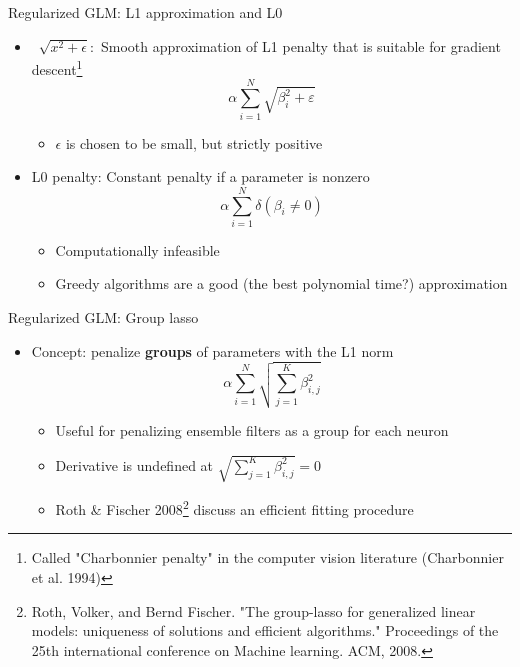 \documentclass[svgnames,13pt]{beamer}
\DeclareRobustCommand{\emph}[1]{\textbf{{\color{emphasizecolor} #1}}}
\begin{document}
\begin{frame}{Regularized GLM: L1 approximation and L0}
\begin{itemize}
	\item <1->~$\sqrt{x^2+\epsilon}:$ Smooth approximation of L1 penalty that is suitable for gradient descent\footnote{Called "Charbonnier penalty" in the computer vision literature (Charbonnier et al. 1994)}\[ \alpha \sum_{i=1}^N \sqrt{\beta_i^2+\varepsilon} \]
	\begin{itemize}
		\item <2->$\epsilon$ is chosen to be small, but strictly positive
		\end{itemize}
	\item <3->L0 penalty: Constant penalty if a parameter is nonzero\[ \alpha \sum_{i=1}^N \delta(\beta_i\ne 0) \]
	\begin{itemize}
		\item <4->Computationally infeasible
		\item <5->Greedy algorithms are a good (the best polynomial time?) approximation
	\end{itemize}
\end{itemize}
\end{frame} 

\begin{frame}{Regularized GLM: Group lasso}
\begin{itemize}
	\item <1->Concept: penalize \emph{groups} of parameters with the L1 norm\[ \alpha \sum_{i=1}^N \sqrt{ \sum_{j=1}^K \beta_{i,j}^2 } \]
	\begin{itemize}
		\item <2->Useful for penalizing ensemble filters as a group for each neuron
		\item <3->Derivative is undefined at $\sqrt{ \sum_{j=1}^K \beta_{i,j}^2 }=0$
		\item <4->Roth \& Fischer 2008\footnote{Roth, Volker, and Bernd Fischer. "The group-lasso for generalized linear models: uniqueness of solutions and efficient algorithms." Proceedings of the 25th international conference on Machine learning. ACM, 2008.} discuss an efficient fitting procedure
	\end{itemize}
\end{itemize}
\end{frame} 
\end{document}
